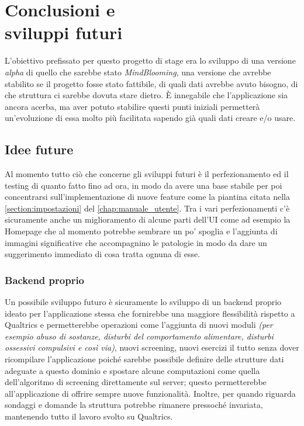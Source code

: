 \chapter[Conclusioni e sviluppi futuri]{Conclusioni e\\sviluppi futuri}
L'obiettivo prefissato per questo progetto di stage era lo sviluppo di una versione \textit{alpha} di quello che sarebbe stato \textit{MindBlooming}, una versione che avrebbe stabilito se il progetto fosse stato fattibile, di quali dati avrebbe avuto bisogno, di che struttura ci sarebbe dovuta stare dietro. È innegabile che l'applicazione sia ancora acerba, ma aver potuto stabilire questi punti iniziali permetterà un'evoluzione di essa molto più facilitata sapendo già quali dati creare e/o usare.

\section{Idee future}
Al momento tutto ciò che concerne gli sviluppi futuri è il perfezionamento ed il testing di quanto fatto fino ad ora, in modo da avere una base stabile per poi concentrarsi sull'implementazione di nuove feature come la piantina citata nella \autoref{section:impostazioni} del \autoref{chap:manuale_utente}.
Tra i vari perfezionamenti c'è sicuramente anche un miglioramento di alcune parti dell'UI come ad esempio la Homepage che al momento potrebbe sembrare un po' spoglia e l'aggiunta di immagini significative che accompagnino le patologie in modo da dare un suggerimento immediato di cosa tratta ognuna di esse.

\subsection{Backend proprio}
Un possibile sviluppo futuro è sicuramente lo sviluppo di un backend proprio ideato per l'applicazione stessa che fornirebbe una maggiore flessibilità rispetto a Qualtrics e permetterebbe operazioni come l'aggiunta di nuovi moduli \textit{(per esempio abuso di sostanze, disturbi del comportamento alimentare, disturbi ossessivi compulsivi e così via)}, nuovi screening, nuovi esercizi il tutto senza dover ricompilare l'applicazione poiché sarebbe possibile definire delle strutture dati adeguate a questo dominio e spostare alcune computazioni come quella dell'algoritmo di screening direttamente sul server; questo permetterebbe all'applicazione di offrire sempre nuove funzionalità. Inoltre, per quando riguarda sondaggi e domande la struttura potrebbe rimanere pressoché invariata, mantenendo tutto il lavoro svolto su Qualtrics.

